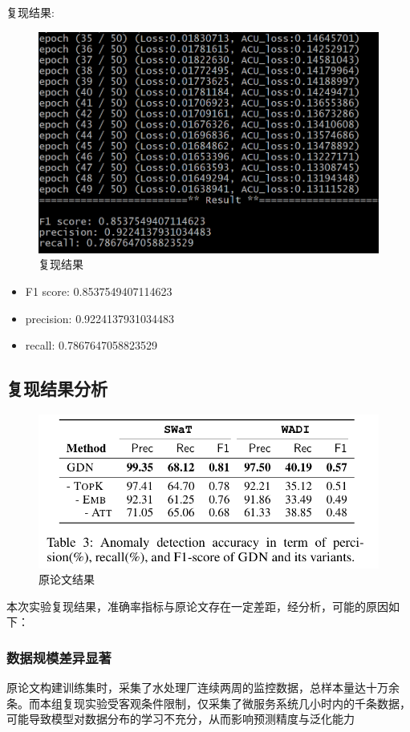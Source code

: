 \documentclass[hyperref,a4paper,UTF8]{ctexart}
\begin{document}
复现结果:
\begin{figure}[H]
    \centering
    \includegraphics[width=0.75\linewidth]{复现/result.png}
    \caption{复现结果}
    \label{fig:enter-label}
\end{figure}
\begin{itemize}
    \item F1 score: 0.8537549407114623
    \item precision: 0.9224137931034483
    \item recall: 0.7867647058823529
\end{itemize}


\subsection{复现结果分析}
\begin{figure}
    \centering
    \includegraphics[width=0.75\linewidth]{复现/论文结果.png}
    \caption{原论文结果}
    \label{fig:enter-label}
\end{figure}
本次实验复现结果，准确率指标与原论文存在一定差距，经分析，可能的原因如下：
\subsubsection{数据规模差异显著}
原论文构建训练集时，采集了水处理厂连续两周的监控数据，总样本量达十万余条。而本组复现实验受客观条件限制，仅采集了微服务系统几小时内的千条数据，可能导致模型对数据分布的学习不充分，从而影响预测精度与泛化能力
\end{document}
